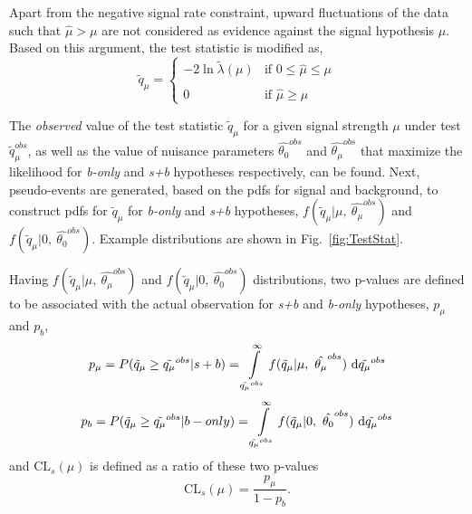 	Apart from the negative signal rate constraint, upward fluctuations of the data such that $\hat{\mu}>\mu$ are not considered as evidence against the signal hypothesis $\mu$. Based on this argument, the test statistic is modified as,
	\[ \tilde{q}_{\mu} =
  \begin{cases}
  \displaystyle
    -2\ln \tilde{\lambda}(\mu)       & \text{if } 0\leq\hat{\mu}\leq\mu\\
    \\
    \displaystyle
    0      & \text{if } \hat{\mu}\geq\mu
  \end{cases}
\]

	The \emph{observed} value of the test statistic $\tilde{q}_{\mu}$ for a given signal strength $\mu$ under test $\tilde{q}_{\mu}^{obs}$, as well as the value of nuisance parameters $\hat{\theta_{0}}^{obs}$ and $\hat{\theta_{\mu}}^{obs}$ that maximize the likelihood for \emph{b-only} and \emph{s+b} hypotheses respectively, can be found. Next, pseudo-events are generated, based on the pdfs for signal and background, to construct pdfs for $\tilde{q}_{\mu}$ for \emph{b-only} and \emph{s+b} hypotheses, $f(\tilde{q}_{\mu}|\mu,\ \hat{\theta_{\mu}}^{obs})$ and $f(\tilde{q}_{\mu}|0,\ \hat{\theta_{0}}^{obs})$. Example distributions are shown in Fig.~\ref{fig:TestStat}. 
	
	Having $f(\tilde{q}_{\mu}|\mu,\ \hat{\theta_{\mu}}^{obs})$ and $f(\tilde{q}_{\mu}|0,\ \hat{\theta_{0}}^{obs})$ distributions, two p-values are defined to be associated with the actual observation for \emph{s+b} and \emph{b-only} hypotheses, $p_{\mu}$ and $p_{b}$,
	\begin{equation}
	\displaystyle
	p_{\mu}=P(\tilde{q}_{\mu}\geq\tilde{q_{\mu}}^{obs} | s+b) = \int\limits_{\tilde{q_{\mu}}^{obs}}^{\infty} f(\tilde{q}_{\mu}|\mu,\ \hat{\theta_{\mu}}^{obs})\ \mathrm{d} \tilde{q_{\mu}}^{obs}\\ 
	\end{equation}
	\begin{equation}
	\displaystyle
	p_{b}=P(\tilde{q}_{\mu}\geq\tilde{q_{\mu}}^{obs} | b-only) = \int\limits_{\tilde{q_{\mu}}^{obs}}^{\infty} f(\tilde{q}_{\mu}|0,\ \hat{\theta_{0}}^{obs})\ \mathrm{d} \tilde{q_{\mu}}^{obs}\\ 
	\end{equation}
	and $\text{CL}_{s}(\mu)$ is defined as a ratio of these two p-values
	\begin{equation}
	\displaystyle
	\text{CL}_{s}(\mu)=\frac{p_{\mu}}{1-p_{b}}.
	\end{equation}
	
